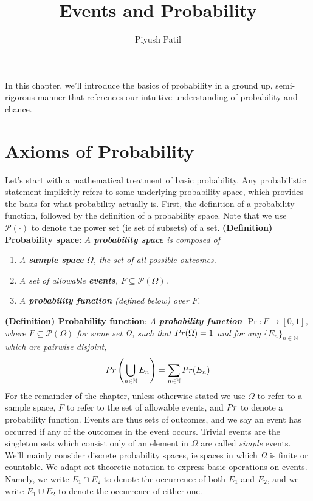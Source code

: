 \documentclass{article}
\newcommand*{\tb}{\textbf}
\newcommand*{\ti}{\textit}
\newcommand*{\nn}{\newline \newline}
\newcommand*{\N}{\mathbb{N}}
\begin{document}
\title{Events and Probability}
\author{Piyush Patil}
\maketitle

In this chapter, we'll introduce the basics of probability in a ground up, semi-rigorous manner that references our intuitive understanding of probability and chance.

\section{Axioms of Probability}
Let's start with a mathematical treatment of basic probability. Any probabilistic statement implicitly refers to some underlying probability space, which provides the basis for what probability actually is. First, the definition of a probability function, followed by the definition of a probability space. Note that we use $ \mathcal{P}(\cdot) $ to denote the power set (ie set of subsets) of a set.
\nn
\tb{(Definition) Probability space}: \ti{A \tb{probability space} is composed of}
\begin{enumerate}
    \item \ti{A \tb{sample space} $ \Omega $, the set of all possible outcomes.}
    \item \ti{A set of allowable \tb{events}, $ F \subseteq \mathcal{P}(\Omega) $.}
    \item \ti{A \tb{probability function} (defined below) over $ F $.}
\end{enumerate}
\tb{(Definition) Probability function}: \ti{A \tb{probability function} $ \Pr: F \rightarrow [0, 1] $, where $ F \subseteq \mathcal{P}(\Omega) $ for some set $ \Omega $, such that $ \\Pr(\Omega) = 1 $ and for any $ \{ E_n \}_{n \in \N} $ which are pairwise disjoint,}
$$ \\Pr \left( \bigcup_{n \in \N} E_n \right) = \sum_{n \in \N} \\Pr(E_n) $$
\nn
For the remainder of the chapter, unless otherwise stated we use $ \Omega $ to refer to a sample space, $ F $ to refer to the set of allowable events, and $ \\Pr $ to denote a probability function. Events are thus sets of outcomes, and we say an event has occurred if any of the outcomes in the event occurs. Trivial events are the singleton sets which consist only of an element in $ \Omega $ are called \ti{simple} events. We'll mainly consider discrete probability spaces, ie spaces in which $ \Omega $ is finite or countable. We adapt set theoretic notation to express basic operations on events. Namely, we write $ E_1 \cap E_2 $ to denote the occurrence of both $ E_1 $ and $ E_2 $, and we write $ E_1 \cup E_2 $ to denote the occurrence of either one. 
\end{document}
